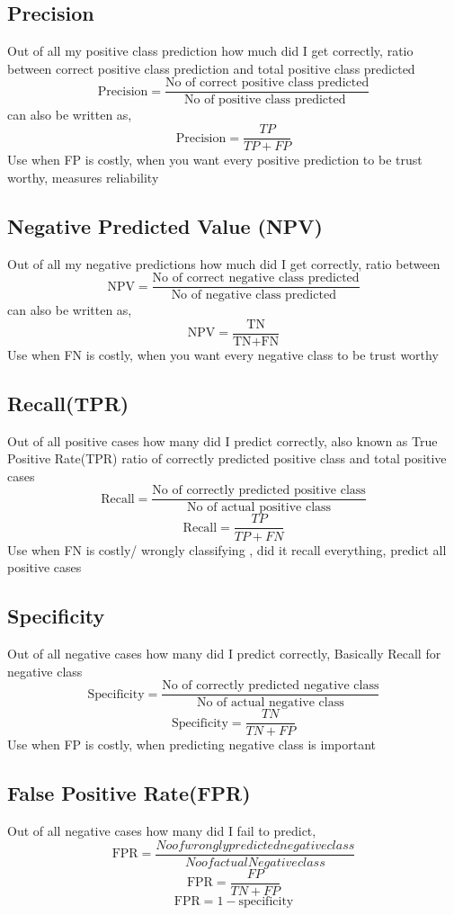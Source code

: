 \documentclass[12pt]{extarticle}
\begin{document}
\subsection{Precision}
Out of all my positive class prediction how much did I get correctly, 
ratio between correct positive class prediction and total positive class predicted
$$ \text{Precision} = \frac{\text{No of correct positive class predicted}}{\text{No of positive class predicted }} $$
can also be written as,
$$\text{Precision} = \frac{TP}{TP+FP}$$
Use when FP is costly, when you want every positive prediction to be trust worthy, measures reliability

\subsection{Negative Predicted Value (NPV)}
Out of all my negative predictions how much did I get correctly, 
ratio between
$$ \text{NPV} = \frac{\text{No of correct negative class predicted}}{\text{No of negative class predicted }} $$
can also be written as,
$$\text{NPV} = \frac{\text{TN}}{\text{TN} + \text{FN}}$$
Use when FN is costly, when you want every negative class to be trust worthy

\subsection{Recall(TPR)}
Out of all positive cases how many did I predict correctly, also known as True Positive Rate(TPR)
ratio of correctly predicted positive class and total positive cases
$$ \text{Recall} = \frac{\text{No of correctly predicted positive class}}{\text{No of actual positive class}}  $$
$$ \text{Recall} = \frac{TP}{TP+FN}$$
Use when FN is costly/ wrongly classifying , did it recall everything, predict all positive cases

\subsection{Specificity}
Out of all negative cases how many did I predict correctly, Basically Recall for negative class
$$ \text{Specificity} = \frac{\text{No of correctly predicted negative class}}{\text{No of actual negative class}}  $$
$$ \text{Specificity} = \frac{TN}{TN+FP}$$
Use when FP is costly, when predicting negative class is important

\subsection{False Positive Rate(FPR)}
Out of all negative cases how many did I fail to predict, 
$$ \text{FPR} = \frac{No of wrongly predicted negative class}{No of actual Negative class} $$
$$ \text{FPR} = \frac{FP}{TN+FP} $$
$$ \text{FPR} = 1 - \text{specificity}$$
\end{document}
